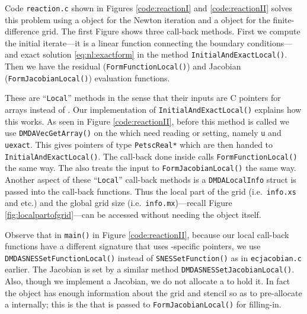 Code \texttt{reaction.c} shown in Figures \eqref{code:reactionI} and \eqref{code:reactionII} solves this problem using a \pSNES object for the Newton iteration and a \pDMDA object for the finite-difference grid.  The first Figure shows three call-back methods.  First we compute the initial iterate---it is a linear function connecting the boundary conditions---and exact solution  \eqref{eq:nl:exactform} in the method \texttt{InitialAndExactLocal()}.  Then we have the residual (\texttt{FormFunctionLocal()}) and Jacobian (\texttt{FormJacobianLocal()}) evaluation functions.

These are ``\texttt{Local}'' methods in the sense that their inputs are C pointers for arrays instead of \pVecs.  Our implementation of \texttt{InitialAndExactLocal()} explains how this works.  As seen in Figure \ref{code:reactionII}, before this method is called we use \texttt{DMDAVecGetArray()} on the \pVecs which need reading or setting, namely \texttt{u} and \texttt{uexact}.  This gives pointers of type \texttt{PetscReal*} which are then handed to \texttt{InitialAndExactLocal()}.  The call-back done inside \pSNES calls \texttt{FormFunctionLocal()} the same way.  The \pSNES also treats the input to  \texttt{FormJacobianLocal()} the same way.  Another aspect of these ``\texttt{Local}'' call-back methods is a \texttt{DMDALocalInfo} struct is passed into the call-back functions.  Thus the local part of the grid (i.e.~\texttt{info.xs} and etc.) and the global grid size (i.e.~\texttt{info.mx})---recall Figure \ref{fig:localpartofgrid}---can be accessed without needing the \pDMDA object itself.

Observe that in \texttt{main()} in Figure \ref{code:reactionII}, because our local call-back functions have a different signature that uses \pDMDA-specific pointers, we use \texttt{DMDASNESSetFunctionLocal()} instead of \texttt{SNESSetFunction()} as in \texttt{ecjacobian.c} earlier.  The Jacobian is set by a similar method \texttt{DMDASNESSetJacobianLocal()}.  Also, though we implement a Jacobian, we do not allocate a \pMat to hold it.  In fact the \pDMDA object has enough information about the grid and stencil so as to pre-allocate a \pMat internally; this is the \pMat that is passed to \texttt{FormJacobianLocal()} for filling-in.




